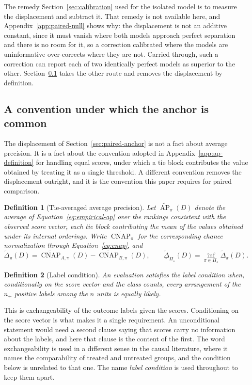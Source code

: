 \documentclass[11pt]{article}
\newcommand{\AP}{\operatorname{AP}}
\newcommand{\CNAP}{\operatorname{CNAP}}
\newcommand{\PSet}{\Pi_\star}
\newcommand{\APta}{\widetilde{\AP}}
\newcommand{\CNAPta}{\widetilde{\CNAP}}
\newcommand{\Dta}{\widetilde{\Delta}}
\newcommand{\RobDta}{\underline{\widetilde{\Delta}}_{\PSet}}
\newtheorem{definition}{Definition}
\theoremstyle{remark}
\begin{document}
The remedy Section~\ref{sec:calibration} used for the isolated model is to measure the displacement and subtract it. That remedy is not available here, and Appendix~\ref{app:paired-null} shows why: the displacement is not an additive constant, since it must vanish where both models approach perfect separation and there is no room for it, so a correction calibrated where the models are uninformative over-corrects where they are not. Carried through, such a correction can report each of two identically perfect models as superior to the other. Section~\ref{sec:paired-convention} takes the other route and removes the displacement by definition.

\subsection{A convention under which the anchor is common}
\label{sec:paired-convention}

The displacement of Section~\ref{sec:paired-anchor} is not a fact about average precision. It is a fact about the convention adopted in Appendix~\ref{app:ap-definition} for handling equal scores, under which a tie block contributes the value obtained by treating it as a single threshold. A different convention removes the displacement outright, and it is the convention this paper requires for paired comparison.

\begin{definition}[Tie-averaged average precision]
Let $\APta_\pi(D)$ denote the average of Equation~\eqref{eq:empirical-ap} over the rankings consistent with the observed score vector, each tie block contributing the mean of the values obtained under its internal orderings. Write $\CNAPta_\pi$ for the corresponding chance normalization through Equation~\eqref{eq:cnap}, and
\[
\Dta_\pi(D)
=
\CNAPta_{A,\pi}(D)-\CNAPta_{B,\pi}(D),
\qquad
\RobDta(D)
=
\inf_{\pi\in\PSet}\Dta_\pi(D).
\]
\end{definition}

\begin{definition}[Label condition]
\label{def:label-condition}
An evaluation satisfies the label condition when, conditionally on the score vector and the class counts, every arrangement of the $n_+$ positive labels among the $n$ units is equally likely.
\end{definition}

This is exchangeability of the outcome labels given the scores. Conditioning on the score vector is what makes it a single requirement. An unconditional statement would need a second clause saying that scores carry no information about the labels, and here that clause is the content of the first. The word exchangeability is used in a different sense in the causal literature, where it names the comparability of treated and untreated groups, and the condition below is unrelated to that one. The name \emph{label condition} is used throughout to keep them apart.
\end{document}
